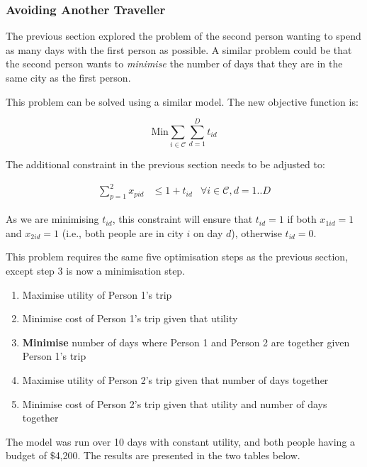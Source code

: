 \documentclass[12pt]{article}
\begin{document}
\subsubsection{Avoiding Another Traveller}

The previous section explored the problem of the second person wanting to spend as many days with the first person as possible. A similar problem could be that the second person wants to \emph{minimise} the number of days that they are in the same city as the first person.

This problem can be solved using a similar model. The new objective function is:

\begin{equation*}
	\text{Min} \sum_{i \in \mathcal{C}} \sum_{d = 1}^{D} t_{id}
\end{equation*}

The additional constraint in the previous section needs to be adjusted to:

\begin{align}
	\sum_{p = 1}^{2} x_{pid} & \leq 1 + t_{id} & \forall i \in \mathcal{C}, d = 1..D
\end{align}

As we are minimising $t_{id}$, this constraint will ensure that $t_{id} = 1$ if both $x_{1id} = 1$ and $x_{2id} = 1$ (i.e., both people are in city $i$ on day $d$), otherwise $t_{id} = 0$.

This problem requires the same five optimisation steps as the previous section, except step 3 is now a minimisation step.

\begin{enumerate}
	\item Maximise utility of Person 1's trip
	\item Minimise cost of Person 1's trip given that utility
	\item \textbf{Minimise} number of days where Person 1 and Person 2 are together given Person 1's trip
	\item Maximise utility of Person 2's trip given that number of days together
	\item Minimise cost of Person 2's trip given that utility and number of days together
\end{enumerate}

The model was run over 10 days with constant utility, and both people having a budget of $\$$4,200. The results are presented in the two tables below.
\end{document}
